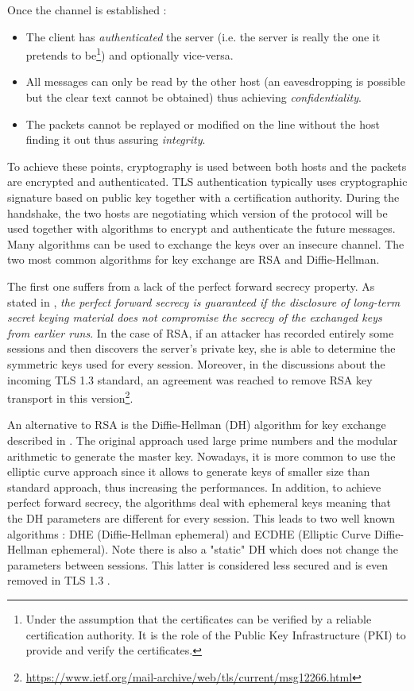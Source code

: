 Once the channel is established :
\begin{itemize}
\item The client has \textit{authenticated} the server (i.e. the server is really the one it pretends to be\footnote{Under the assumption that the certificates can be verified by a reliable certification authority. It is the role of the Public Key Infrastructure (PKI) to provide and verify the certificates.}) and optionally vice-versa.
\item All messages can only be read by the other host (an eavesdropping is possible but the clear text cannot be obtained) thus achieving \textit{confidentiality}.
\item The packets cannot be replayed or modified on the line without the host finding it out thus assuring \textit{integrity}.
\end{itemize}

To achieve these points, cryptography is used between both hosts and the packets are encrypted and authenticated. TLS authentication typically uses cryptographic signature based on public key together with a certification authority. During the handshake, the two hosts are negotiating which version of the protocol will be used together with algorithms to encrypt and authenticate the future messages. Many algorithms can be used to exchange the keys over an insecure channel. The two most common algorithms for key exchange are RSA and Diffie-Hellman.

The first one suffers from a lack of the perfect forward secrecy property. As stated in \cite{diffie1992authentication}, \textit{the perfect forward secrecy is guaranteed if the disclosure of long-term secret keying material does not compromise the secrecy of the exchanged keys from earlier runs}. In the case of RSA, if an attacker has recorded entirely some sessions and then discovers the server's private key, she is able to determine the symmetric keys used for every session. Moreover, in the discussions about the incoming TLS 1.3 standard, an agreement was reached to remove RSA key transport in this version\footnote{\url{https://www.ietf.org/mail-archive/web/tls/current/msg12266.html}}.

An alternative to RSA is the Diffie-Hellman (DH) algorithm for key exchange described in \cite{diffie1976new}. The original approach used large prime numbers and the modular arithmetic to generate the master key. Nowadays, it is more common to use the elliptic curve approach since it allows to generate keys of smaller size than standard approach, thus increasing the performances\cite{joy2004}. In addition, to achieve perfect forward secrecy, the algorithms deal with ephemeral keys meaning that the DH parameters are different for every session. This leads to two well known algorithms : DHE (Diffie-Hellman ephemeral) and ECDHE (Elliptic Curve Diffie-Hellman ephemeral). Note there is also a "static" DH which does not change the parameters between sessions. This latter is considered less secured and is even removed in TLS 1.3 \cite{draft-tls13}.

